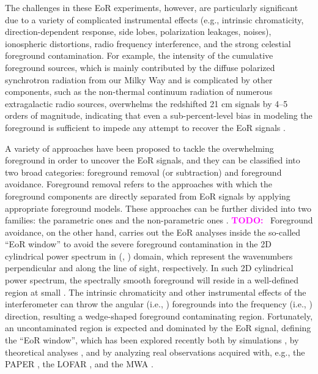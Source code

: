 \documentclass[modern]{aastex61}
\newcommand{\klos}{\text{$k_{\parallel}$}}
\newcommand{\kperp}{\text{$k_{\bot}$}}
\newcommand{\TODO}[1]{\textcolor{magenta}{\textbf{TODO:}}~\uuline{#1}}
\begin{document}
The challenges in these EoR experiments, however, are particularly
significant due to a variety of complicated instrumental effects
(e.g., intrinsic chromaticity, direction-dependent response, side lobes,
polarization leakages, noises), ionospheric distortions, radio frequency
interference, and the strong celestial foreground contamination.
For example, the intensity of the cumulative foreground sources, which
is mainly contributed by the diffuse polarized synchrotron radiation from
our Milky Way and is complicated by other components, such as the
non-thermal continuum radiation of numerous extragalactic radio sources,
overwhelms the redshifted 21 cm signals by \numrange{4}{5} orders of
magnitude, indicating that even a sub-percent-level bias in modeling
the foreground is sufficient to impede any attempt to recover the EoR
signals \citep[e.g.,][]{beardsley2016,murray2017,procopio2017}.

A variety of approaches have been proposed to tackle the overwhelming
foreground in order to uncover the EoR signals, and they can be classified
into two broad categories: foreground removal (or subtraction) and
foreground avoidance.
Foreground removal refers to the approaches with which the foreground
components are directly separated from EoR signals by applying appropriate
foreground models.
These approaches can be further divided into two families:
the parametric ones \citep[e.g.,][]{wang2006,jelic2008,liu2009,wang2013}
and the non-parametric ones
\citep[e.g.,][]{harker2009,wang2010,chapman2012,chapman2013,gu2013}.
\TODO{[needs improve]}
Foreground avoidance, on the other hand, carries out the EoR analyses
inside the so-called \enquote{EoR window} to avoid the severe foreground
contamination in the 2D cylindrical power spectrum in (\kperp, \klos)
domain, which represent the wavenumbers perpendicular and along the
line of sight, respectively.
In such 2D cylindrical power spectrum, the spectrally smooth foreground
will reside in a well-defined region at small \klos.
The intrinsic chromaticity and other instrumental effects of the
interferometer can throw the angular (i.e., \kperp) foregrounds into
the frequency (i.e., \klos) direction, resulting a wedge-shaped foreground
contaminating region.
Fortunately, an uncontaminated region is expected and dominated by the
EoR signal, defining the \enquote{EoR window}, which has been explored
recently both by simulations
\citep[e.g.,][]{datta2010,thyagarajan2013,thyagarajan2015,barry2016},
by theoretical analyses \citep[e.g.,][]{morales2012,hazelton2013,liu2014},
and by analyzing real observations acquired with, e.g.,
the PAPER \citep{pober2013,ali2015},
the LOFAR \citep{patil2017},
and the MWA \citep{dillon2015,beardsley2016,procopio2017}.
\end{document}

